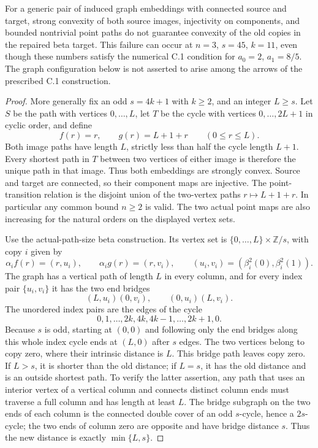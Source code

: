 \begin{proposition}
\label{C:connected-convex-warning}
For a generic pair of induced graph embeddings with connected source
and target, strong convexity of both source images, injectivity on
components, and bounded nontrivial point paths do not guarantee
convexity of the old copies in the repaired beta target. This failure
can occur at $n=3$, $s=45$, $k=11$, even though these numbers satisfy
the numerical C.1 condition for $a_0=2$, $a_1=8/5$.
The graph configuration below is not asserted to arise among the
arrows of the prescribed C.1 construction.
\end{proposition}

\begin{proof}
More generally fix an odd $s=4k+1$ with $k\geq2$, and an integer
$L\geq s$. Let $S$ be the path with vertices $0,\ldots,L$, let
$T$ be the cycle with vertices $0,\ldots,2L+1$ in cyclic order, and
define
\[
 f(r)=r,\qquad g(r)=L+1+r\qquad(0\leq r\leq L).
\]
Both image paths have length $L$, strictly less than half the cycle
length $L+1$. Every shortest path in $T$ between two vertices of
either image is therefore the unique path in that image. Thus both
embeddings are strongly convex. Source and target are connected, so
their component maps are injective. The point-transition relation is
the disjoint union of the two-vertex paths
$r\mapsto L+1+r$. In particular any common bound $n\geq2$ is valid.
The two actual point maps are also increasing for the natural orders
on the displayed vertex sets.

Use the actual-path-size beta construction. Its vertex set is
$\{0,\ldots,L\}\times\mathbb Z/s$, with copy $i$ given by
\[
 \alpha_i f(r)=(r,u_i),\qquad
 \alpha_i g(r)=(r,v_i),\qquad
 (u_i,v_i)=(\beta_i^2(0),\beta_i^2(1)).
\]
The graph has a vertical path of length $L$ in every column, and for
every index pair $\{u_i,v_i\}$ it has the two end bridges
\[
 (L,u_i)(0,v_i),\qquad (0,u_i)(L,v_i).
\]
The unordered index pairs are the edges of the cycle
\[
 0,1,\ldots,2k,4k,4k-1,\ldots,2k+1,0.
\]
Because $s$ is odd, starting at $(0,0)$ and following only the end
bridges along this whole index cycle ends at $(L,0)$ after $s$
edges. The two vertices belong to copy zero, where their intrinsic
distance is $L$. This bridge path leaves copy zero. If $L>s$, it
is shorter than the old distance; if $L=s$, it has the old distance
and is an outside shortest path. To verify the latter assertion,
any path that uses an interior vertex of a vertical column and
connects distinct column ends must traverse a full column and has
length at least $L$. The bridge subgraph on the two ends of each
column is the connected double cover of an odd $s$-cycle, hence a
$2s$-cycle; the two ends of column zero are opposite and have bridge
distance $s$. Thus the new distance is exactly $\min\{L,s\}$.


\end{proof}
